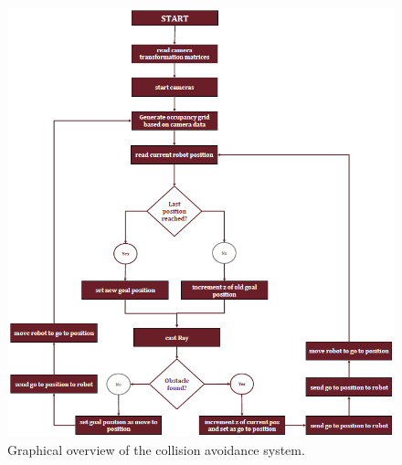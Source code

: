 \newpage
\begin{figure}[H]
	\centering\includegraphics[scale=0.9]{images/system_overview.png}
	\caption{Graphical overview of the collision avoidance system.}
	\label{fig:system}
\end{figure}





